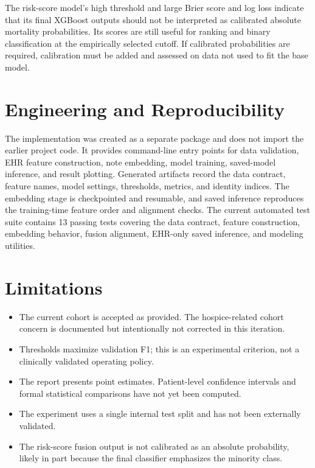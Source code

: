 \documentclass[11pt]{article}
\begin{document}
The risk-score model's high threshold and large Brier score and log loss indicate
that its final XGBoost outputs should not be interpreted as calibrated absolute
mortality probabilities. Its scores are still useful for ranking and binary
classification at the empirically selected cutoff. If calibrated probabilities
are required, calibration must be added and assessed on data not used to fit the
base model.

\section{Engineering and Reproducibility}

The implementation was created as a separate package and does not import the
earlier project code. It provides command-line entry points for data validation,
EHR feature construction, note embedding, model training, saved-model inference,
and result plotting. Generated artifacts record the data contract, feature names,
model settings, thresholds, metrics, and identity indices. The embedding stage is
checkpointed and resumable, and saved inference reproduces the training-time
feature order and alignment checks. The current automated test suite contains 13
passing tests covering the data contract, feature construction, embedding
behavior, fusion alignment, EHR-only saved inference, and modeling utilities.

\section{Limitations}

\begin{itemize}
  \item The current cohort is accepted as provided. The hospice-related cohort
        concern is documented but intentionally not corrected in this iteration.
  \item Thresholds maximize validation F1; this is an experimental criterion, not
        a clinically validated operating policy.
  \item The report presents point estimates. Patient-level confidence intervals
        and formal statistical comparisons have not yet been computed.
  \item The experiment uses a single internal test split and has not been
        externally validated.
  \item The risk-score fusion output is not calibrated as an absolute
        probability, likely in part because the final classifier emphasizes the
        minority class.
\end{itemize}
\end{document}
